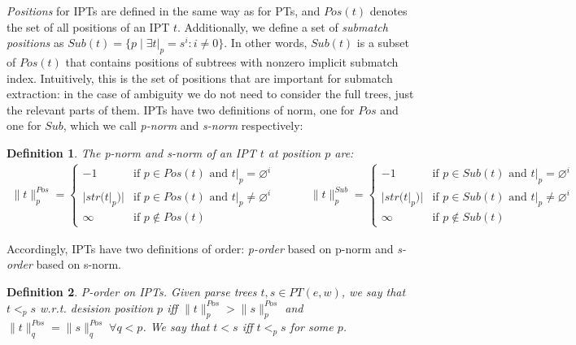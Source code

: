 \documentclass[AMA,STIX1COL]{WileyNJD-v2}
\newcommand{\pnorm}[2]{\|{#1}\|^{Pos}_{#2}}
\newcommand{\snorm}[2]{\|{#1}\|^{Sub}_{#2}}
\newtheorem{Xdef}{Definition}
\begin{document}
\emph{Positions} for IPTs are defined in the same way as for PTs, and
$Pos(t)$ denotes the set of all positions of an IPT $t$.
Additionally, we define a set of \emph{submatch positions} as
$Sub(t) = \{ p \mid \exists t|_p = s^i : i \neq 0 \}$.
In other words, $Sub(t)$ is a subset of $Pos(t)$ that contains positions of subtrees with nonzero implicit submatch index.
Intuitively, this is the set of positions that are important for submatch extraction:
in the case of ambiguity we do not need to consider the full trees,
just the relevant parts of them.
%
IPTs have two definitions of norm, one for $Pos$ and one for $Sub$,
which we call \emph{p-norm} and \emph{s-norm} respectively:

    \begin{Xdef}\label{tnorm_of_IPTs}
    The \emph{p-norm} and \emph{s-norm} of an IPT $t$ at position $p$ are:
    \begin{align*}
        \pnorm{t}{p} =
            \begin{cases}
                -1          &\text{if } p \in Pos(t) \text{ and } t|_p = \varnothing^i  \\
                |str(t|_p)| &\text{if } p \in Pos(t) \text{ and } t|_p \neq \varnothing^i \\
                \infty      &\text{if } p \not\in Pos(t)
            \end{cases}
    \quad\quad\quad
        \snorm{t}{p} =
            \begin{cases}
                -1          &\text{if } p \in Sub(t) \text{ and } t|_p = \varnothing^i  \\
                |str(t|_p)| &\text{if } p \in Sub(t) \text{ and } t|_p \neq \varnothing^i \\
                \infty      &\text{if } p \not\in Sub(t)
            \end{cases}
    \end{align*}
    \end{Xdef}


Accordingly, IPTs have two definitions of order:
\emph{p-order} based on p-norm
and \emph{s-order} based on s-norm.

    \begin{Xdef}\label{total_order_on_IPTs}
    \emph{P-order on IPTs.}
    Given parse trees $t, s \in PT(e, w)$, we say that $t <_p s$ w.r.t. \emph{desision position} $p$
    iff $\pnorm{t}{p} > \pnorm{s}{p}$ and $\pnorm{t}{q} = \pnorm{s}{q} \; \forall q < p$.
    We say that $t < s$ iff $t <_p s$ for some $p$.
    \end{Xdef}
\end{document}
